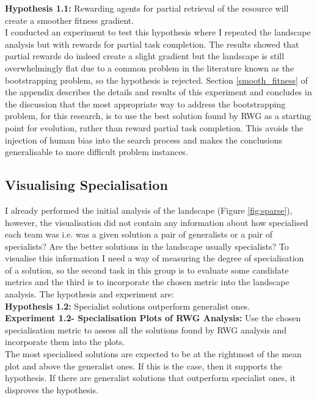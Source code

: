 \documentclass[12pt]{article}
\begin{document}
\textbf{Hypothesis 1.1:} Rewarding agents for partial retrieval of the resource will create a smoother fitness gradient.\\

I conducted an experiment to test this hypothesis where I repeated the landscape analysis but with rewards for partial task completion.
The results showed that partial rewards do indeed create a slight gradient but the landscape is still overwhelmingly flat due to a common problem in the literature known as the bootstrapping problem, so the hypothesis is rejected.
Section \ref{smooth_fitness} of the appendix describes the details and results of this experiment and concludes in the discussion that the most appropriate way to address the bootstrapping problem, for this research, is to use the best solution found by RWG as a starting point for evolution, rather than reward partial task completion. 
This avoids the injection of human bias into the search process and makes the conclusions generalisable to more difficult problem instances.

\subsection{Visualising Specialisation}\label{visualising_specialisation}

I already performed the initial analysis of the landscape (Figure \ref{fig:sparse}), however, the visualisation did not contain any information about how specialised each team was i.e. was a given solution a pair of generalists or a pair of specialists? 
Are the better solutions in the landscape usually specialists? 
To visualise this information I need a way of measuring the degree of specialisation of a solution, so the second task in this group is to evaluate some candidate metrics and the third is to incorporate the chosen metric into the landscape analysis.
The hypothesis and experiment are:\\

\textbf{Hypothesis 1.2:} Specialist solutions outperform generalist ones.\\

\textbf{Experiment 1.2- Specialisation Plots of RWG Analysis:}  Use the chosen specialisation metric to assess all the solutions found by RWG analysis and incorporate them into the plots.\\

The most specialised solutions are expected to be at the rightmost of the mean plot and above the generalist ones.
If this is the case, then it supports the hypothesis.
If there are generalist solutions that outperform specialist ones, it disproves the hypothesis.
\end{document}
